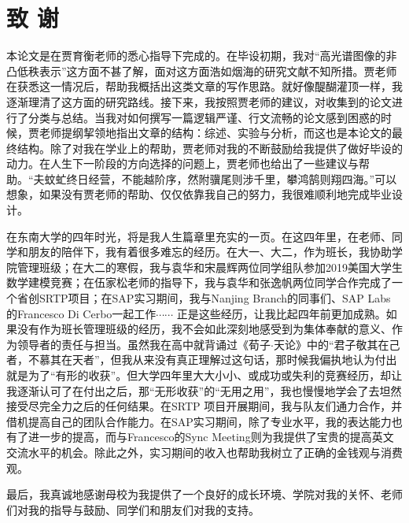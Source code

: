 \documentclass[12pt, a4paper]{article}
\begin{document}
\section*{致 \quad 谢}
\par 本论文是在贾育衡老师的悉心指导下完成的。在毕设初期，我对“高光谱图像的非凸低秩表示”这方面不甚了解，面对这方面浩如烟海的研究文献不知所措。贾老师在获悉这一情况后，帮助我概括出这类文章的写作思路。就好像醍醐灌顶一样，我逐渐理清了这方面的研究路线。接下来，我按照贾老师的建议，对收集到的论文进行了分类与总结。当我对如何撰写一篇逻辑严谨、行文流畅的论文感到困惑的时候，贾老师提纲挈领地指出文章的结构：综述、实验与分析，而这也是本论文的最终结构。除了对我在学业上的帮助，贾老师对我的不断鼓励给我提供了做好毕设的动力。在人生下一阶段的方向选择的问题上，贾老师也给出了一些建议与帮助。“夫蚊虻终日经营，不能越阶序，然附骥尾则涉千里，攀鸿鹄则翔四海。”可以想象，如果没有贾老师的帮助、仅仅依靠我自己的努力，我很难顺利地完成毕业设计。
\par 在东南大学的四年时光，将是我人生篇章里充实的一页。在这四年里，在老师、同学和朋友的陪伴下，我有着很多难忘的经历。在大一、大二，作为班长，我协助学院管理班级；在大二的寒假，我与袁华和宋晨辉两位同学组队参加2019美国大学生数学建模竞赛；在伍家松老师的指导下，我与袁华和张逸帆两位同学合作完成了一个省创SRTP项目；在SAP实习期间，我与Nanjing Branch的同事们、SAP Labs 的Francesco Di Cerbo一起工作$\cdots\cdots$ 正是这些经历，让我比起四年前更加成熟。如果没有作为班长管理班级的经历，我不会如此深刻地感受到为集体奉献的意义、作为领导者的责任与担当。虽然我在高中就背诵过《荀子$\cdot$天论》中的“君子敬其在己者，不慕其在天者”，但我从来没有真正理解过这句话，那时候我偏执地认为付出就是为了“有形的收获”。但大学四年里大大小小、或成功或失利的竞赛经历，却让我逐渐认可了在付出之后，那“无形收获”的“无用之用”，我也慢慢地学会了去坦然接受尽完全力之后的任何结果。在SRTP 项目开展期间，我与队友们通力合作，并借机提高自己的团队合作能力。在SAP实习期间，除了专业水平，我的表达能力也有了进一步的提高，而与Francesco的Sync Meeting则为我提供了宝贵的提高英文交流水平的机会。除此之外，实习期间的收入也帮助我树立了正确的金钱观与消费观。
\par 最后，我真诚地感谢母校为我提供了一个良好的成长环境、学院对我的关怀、老师们对我的指导与鼓励、同学们和朋友们对我的支持。
\end{document}
